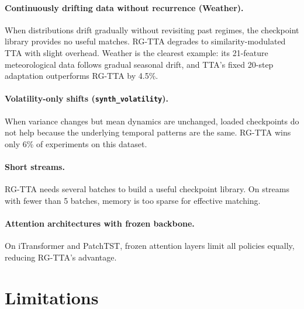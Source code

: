 \documentclass[11pt,a4paper]{article}
\begin{document}
\paragraph{Continuously drifting data without recurrence (Weather).} When distributions drift gradually without revisiting past regimes, the checkpoint library provides no useful matches. RG-TTA degrades to similarity-modulated TTA with slight overhead. Weather is the clearest example: its 21-feature meteorological data follows gradual seasonal drift, and TTA's fixed 20-step adaptation outperforms RG-TTA by 4.5\%.

\paragraph{Volatility-only shifts (\texttt{synth\_volatility}).} When variance changes but mean dynamics are unchanged, loaded checkpoints do not help because the underlying temporal patterns are the same. RG-TTA wins only 6\% of experiments on this dataset.

\paragraph{Short streams.} RG-TTA needs several batches to build a useful checkpoint library. On streams with fewer than 5 batches, memory is too sparse for effective matching.

\paragraph{Attention architectures with frozen backbone.} On iTransformer and PatchTST, frozen attention layers limit all policies equally, reducing RG-TTA's advantage.


\section{Limitations}
\label{sec:limitations}
\end{document}

